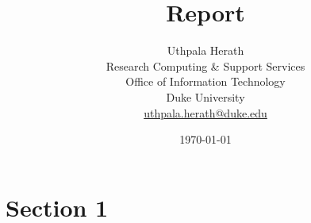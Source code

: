 \documentclass[10pt,letterpaper]{article}
\title{Report}
\author{Uthpala Herath\\
\small Research Computing \& Support Services\\
\small Office of Information Technology \\
\small Duke University\\
\small \href{mailto:uthpala.herath@duke.edu}{uthpala.herath@duke.edu}}
\date{\today}
\begin{document}
\maketitle



\section{Section 1}





\end{document}
